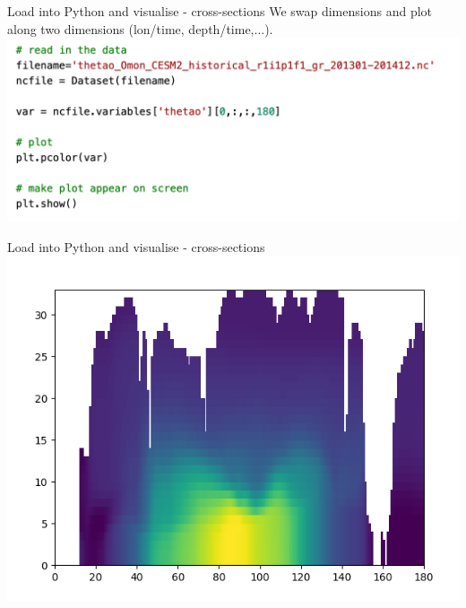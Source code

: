  
\begin{frame}{\insertsectionnumber{ |} Load into Python and visualise - cross-sections}
    We swap dimensions and plot along two dimensions (lon/time, depth/time,...).\\
        \includegraphics[scale=0.35]{images/Script2_step1.png}
\end{frame}
          
          
\begin{frame}{\insertsectionnumber{ |} Load into Python and visualise - cross-sections}
    \includegraphics[scale=0.45]{images/Script1_fig7.png}
\end{frame}
 
